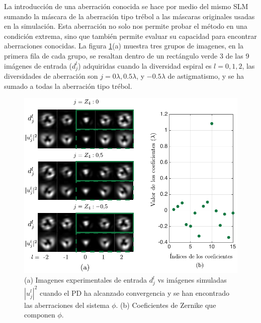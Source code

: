 La introducción de una aberración conocida se hace por medio del mismo
SLM sumando la máscara de la aberración tipo trébol a las máscaras 
originales usadas en la simulación. %
Esta aberración no solo nos permite probar el
método en una condición extrema, sino que también permite evaluar
su capacidad para encontrar aberraciones conocidas. 
La figura \ref{fig:exp_results}(a) muestra tres grupos de imagenes, en
la primera fila de cada grupo, se resaltan dentro
de un rectángulo verde 3 de las 9 imágenes de entrada ($d_j^l$)
adquiridas cuando la diversidad espiral es $l=0,1,2$, las diversidades
de aberración son $j = 0\lambda, 0.5\lambda$, y  $-0.5\lambda$ de
astigmatismo, y se ha sumado a todas la aberración tipo trébol.   
\begin{figure}[h!]
\centering
\includegraphics[scale=1]{experimental_results_07032015_small.pdf}
\caption[Resultados experimentales de la reconstrucción de fase con
PD.]{(a) Imagenes experimentales de
  entrada $d_j^l$ vs imágenes simuladas $|u_j^l|^2$ cuando el PD ha
  alcanzado convergencia y se han encontrado las aberraciones del
  sistema $\phi$.  (b) Coeficientes de Zernike que componen $\phi$.} 
\label{fig:exp_results}
\end{figure} 

